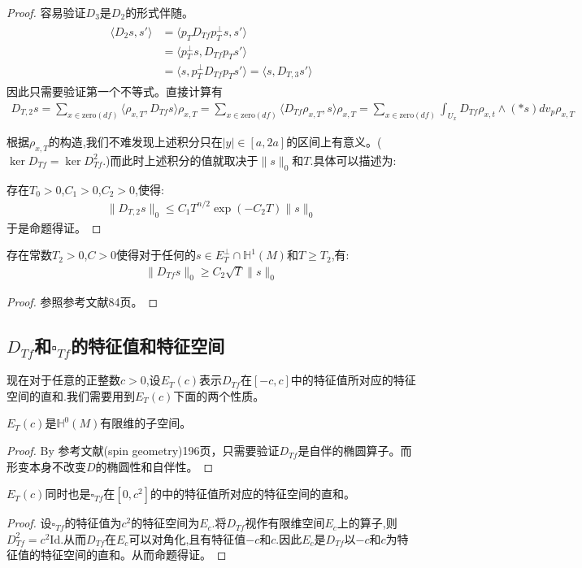 \begin{proof}
	容易验证$D_3$是$D_2$的形式伴随。
    \begin{align}
	\begin{split}
		\langle D_2s,s'\rangle &=\langle p_TD_{Tf}p_T^{\perp}s,s'\rangle \\
	 &=\langle p_T^{\perp}s,D_{Tf}p_Ts'\rangle\\
	 &=\langle s,p_T^{\perp}D_{Tf}p_Ts'\rangle=\langle s,D_{T,3}s'\rangle
	\end{split}
	\end{align}
	因此只需要验证第一个不等式。直接计算有
    \begin{align}
		D_{T,2}s=\sum_{x \in \mathrm{zero}(df)}\langle \rho_{x,T},D_{Tf}s\rangle\rho_{x,T}=\sum_{x \in \mathrm{zero}(df)}\langle D_{Tf}\rho_{x,T},s\rangle\rho_{x,T}=\sum_{x\in \mathrm{zero}(df)}\int_{U_x}D_{Tf}\rho_{x,t} \wedge (*s) dv_p \rho_{x,T}
	\end{align}
	
	根据$\rho_{x,T}$的构造,我们不难发现上述积分只在$|y|\in [a,2a]$的区间上有意义。($\ker D_{Tf}=\ker D_{Tf}^2$.)而此时上述积分的值就取决于$\|s\|_0$和$T$.具体可以描述为:

	存在$T_0>0$,$C_1>0$,$C_2>0$,使得:
	\begin{align}
		\|D_{T,2}s\|_0 \leq C_1T^{n/2}\exp(-C_2T)\|s\|_0
	\end{align}
	于是命题得证。
\end{proof}
\begin{proposition}
	存在常数$T_2>0$,$C>0$使得对于任何的$s \in E_T^\perp \cap \mathbb{H}^1(M)$和$T\geq T_2$,有:
	\begin{align}
		\|D_{Tf}s\|_0\geq C_2\sqrt{T}\|s\|_0
	\end{align}
\end{proposition}
\begin{proof}
	参照参考文献84页。
\end{proof}
\subsection{$D_{Tf}$和$\square_{Tf}$的特征值和特征空间}
现在对于任意的正整数$c>0$,设$E_T(c)$表示$D_{Tf}$在$[-c,c]$中的特征值所对应的特征空间的直和.我们需要用到$E_T(c)$下面的两个性质。
\begin{proposition}
	$E_T(c)$是$\mathbb{H}^0(M)$有限维的子空间。
\end{proposition}
\begin{proof}
	By 参考文献(spin geometry)196页，只需要验证$D_{Tf}$是自伴的椭圆算子。而形变本身不改变$D$的椭圆性和自伴性。
\end{proof}
\begin{proposition}
	$E_T(c)$同时也是$\square_{Tf}$在$[0,c^2]$的中的特征值所对应的特征空间的直和。
\end{proposition}
\begin{proof}
	设$\square_{Tf}$的特征值为$c^2$的特征空间为$E_c$.将$D_{Tf}$视作有限维空间$E_c$上的算子,则$D_{Tf}^2=c^2\mathrm{Id}$.从而$D_{Tf}$在$E_c$可以对角化,且有特征值$-c$和$c$.因此$E_c$是$D_{Tf}$以$-c$和$c$为特征值的特征空间的直和。从而命题得证。
\end{proof}


